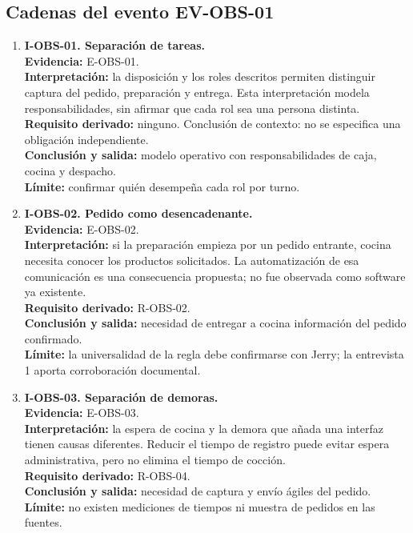 \subsection{Cadenas del evento EV-OBS-01}
\label{subsec:ilacion-obs}

\begin{enumerate}
  \item \textbf{I-OBS-01. Separación de tareas.}\\
  \textbf{Evidencia:} E-OBS-01.\\
  \textbf{Interpretación:} la disposición y los roles descritos permiten
  distinguir captura del pedido, preparación y entrega. Esta interpretación
  modela responsabilidades, sin afirmar que cada rol sea una persona
  distinta.\\
  \textbf{Requisito derivado:} ninguno. Conclusión de contexto: no se
  especifica una obligación independiente.\\
  \textbf{Conclusión y salida:} modelo operativo con responsabilidades de
  caja, cocina y despacho.\\
  \textbf{Límite:} confirmar quién desempeña cada rol por turno.

  \item \textbf{I-OBS-02. Pedido como desencadenante.}\\
  \textbf{Evidencia:} E-OBS-02.\\
  \textbf{Interpretación:} si la preparación empieza por un pedido entrante,
  cocina necesita conocer los productos solicitados. La automatización de
  esa comunicación es una consecuencia propuesta; no fue observada como
  software ya existente.\\
  \textbf{Requisito derivado:} R-OBS-02.\\
  \textbf{Conclusión y salida:} necesidad de entregar a cocina información
  del pedido confirmado.\\
  \textbf{Límite:} la universalidad de la regla debe confirmarse con Jerry;
  la entrevista 1 aporta corroboración documental.

  \item \textbf{I-OBS-03. Separación de demoras.}\\
  \textbf{Evidencia:} E-OBS-03.\\
  \textbf{Interpretación:} la espera de cocina y la demora que añada una
  interfaz tienen causas diferentes. Reducir el tiempo de registro puede
  evitar espera administrativa, pero no elimina el tiempo de cocción.\\
  \textbf{Requisito derivado:} R-OBS-04.\\
  \textbf{Conclusión y salida:} necesidad de captura y envío ágiles del
  pedido.\\
  \textbf{Límite:} no existen mediciones de tiempos ni muestra de pedidos en
  las fuentes.


\end{enumerate}
